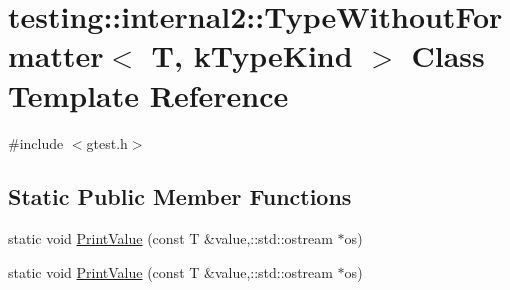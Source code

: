 \hypertarget{classtesting_1_1internal2_1_1_type_without_formatter}{\section{testing\-:\-:internal2\-:\-:Type\-Without\-Formatter$<$ T, k\-Type\-Kind $>$ Class Template Reference}
\label{classtesting_1_1internal2_1_1_type_without_formatter}
}


{\ttfamily \#include $<$gtest.\-h$>$}

\subsection*{Static Public Member Functions}
\begin{DoxyCompactItemize}
\item 
static void \hyperlink{classtesting_1_1internal2_1_1_type_without_formatter_a6c377c9580fce3a0226911417053f417}{Print\-Value} (const T \&value,\-::std\-::ostream $\ast$os)
\item 
static void \hyperlink{classtesting_1_1internal2_1_1_type_without_formatter_a6c377c9580fce3a0226911417053f417}{Print\-Value} (const T \&value,\-::std\-::ostream $\ast$os)
\end{DoxyCompactItemize}


